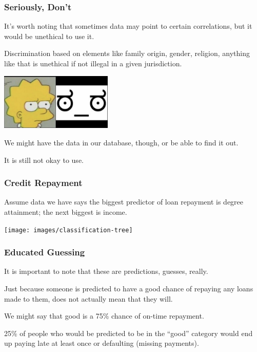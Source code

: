 \begin{frame}
\frametitle{Seriously, Don't}

It's worth noting that sometimes data may point to certain correlations, but it would be unethical to use it. 

Discrimination based on elements like family origin, gender, religion, anything like that is unethical if not illegal in a given jurisdiction. 

\begin{center}
	\includegraphics[width=0.4\textwidth]{images/disapproval-face.png}
\end{center}

We might have the data in our database, though, or be able to find it out.

It is still not okay to use.

\end{frame}


\begin{frame}
\frametitle{Credit Repayment}

Assume data we have says the biggest predictor of loan repayment is degree attainment; the next biggest is income. 


\begin{center}
\texttt{[image: images/classification-tree]}
\end{center}

\end{frame}


\begin{frame}
\frametitle{Educated Guessing}

It is important to note that these are predictions, guesses, really. 

Just because someone is predicted to have a good chance of repaying any loans made to them, does not actually mean that they will. 

We might say that good is a 75\% chance of on-time repayment. 

25\% of people who would be predicted to be in the ``good'' category would end up paying late at least once or defaulting (missing payments).

\end{frame}

